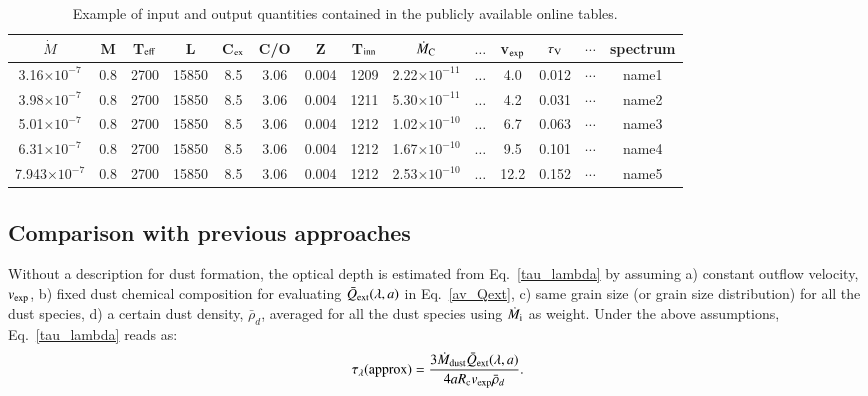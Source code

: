 \documentclass[useAMS,usenatbib]{mn2e/mn2e}
\begin{document}
\begin{table*}
\begin{center}
\caption{Example of input and output quantities contained in the publicly available online tables.}
\label{Table:grid_example}
\begin{tabular}{c c c c c c c c c c c c c c}
\hline
$\dot{M}$ & M & T$_{\rm eff}$ & L & C$_{\rm ex}$ & C/O & Z & T$_{\rm inn}$ & $\dot{M}_{\rm C}$ & $\dots$ & v$_{\rm exp}$ & $\tau_{\rm V}$ & $\cdots$   & spectrum \\
\hline
    3.16$\times10^{-7}$&      0.8&       2700&       15850&       8.5&       3.06&    0.004&       1209&   2.22$\times10^{-11}$ &   $\dots$  &       4.0 &     0.012& $\cdots$   &name1 \\
  3.98$\times10^{-7}$&      0.8&       2700&       15850&       8.5&       3.06&    0.004&       1211 &   5.30$\times10^{-11}$ &  $\dots$ &       4.2&     0.031&  $\cdots$    & name2 \\
   5.01$\times10^{-7}$ &      0.8&       2700&       15850&       8.5 &       3.06&    0.004&       1212&   1.02$\times10^{-10}$&  $\dots$ &       6.7&     0.063&  $\cdots$   &name3 \\
  6.31$\times10^{-7}$&      0.8&       2700&       15850&       8.5&       3.06&    0.004&       1212&   1.67$\times10^{-10}$&   $\dots$ &       9.5&      0.101& $\cdots$    &name4 \\
   7.943$\times10^{-7}$&      0.8 &       2700 &       15850 &       8.5 &      3.06 &    0.004 &       1212 &   2.53$\times10^{-10}$&  $\dots$ &       12.2 &      0.152 &  $\cdots$  & name5 \\
\hline
\end{tabular}
\end{center}
\end{table*}

\subsection{Comparison with previous approaches}
\label{comp_grams}

Without a description for dust formation, the optical depth is estimated from Eq.~\ref{tau_lambda} by assuming a) constant outflow velocity, $v_{\rm exp}$, b) fixed dust chemical composition for evaluating $\bar{Q}_{\rm ext}(\lambda, a)$ in Eq.~\ref{av_Qext}, c) same grain size (or grain size distribution) for all the dust species, d) a certain dust density, $\bar{\rho}_d$, averaged for all the dust species using $\dot{M}_{\rm i}$ as weight.
Under the above assumptions, Eq.~\ref{tau_lambda} reads as:
\begin{equation}\label{tau_approx}
\tau_\lambda{\rm (approx)}=\frac{3\dot{M}_{\rm dust}\bar{Q}_{\rm ext}(\lambda, a)}{4 a R_{\rm c} v_{\rm exp} \bar{\rho}_d}.
\end{equation}
\end{document}
